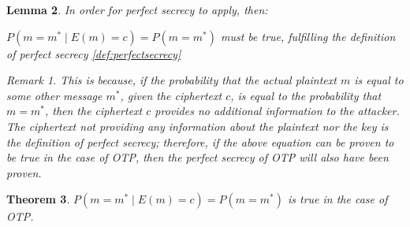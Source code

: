 \documentclass[12pt, a4paper]{report}
\newtheorem{thm}{Theorem}[section]
\newtheorem{lemma}[thm]{Lemma}
\theoremstyle{definition}
\theoremstyle{remark}
\newtheorem{rem}[thm]{Remark}
\begin{document}
\begin{lemma}
In order for perfect secrecy to apply, then:

$P( m=m^{*} \mid E(m)=c ) = P( m=m^{*} )$
must be true, fulfilling the definition of perfect secrecy \ref{def:perfectsecrecy}

\begin{rem}
This is because, if the probability that the actual plaintext $m$ is equal to some other message $m^{*}$, given the ciphertext $c$, is equal to the probability that $m=m^{*}$, then the ciphertext $c$ provides no additional information to the attacker. The ciphertext not providing any information about the plaintext nor the key is the definition of perfect secrecy; therefore, if the above equation can be proven to be true in the case of OTP, then the perfect secrecy of OTP will also have been proven.
\end{rem}
\end{lemma}

\begin{thm}
$P( m=m^{*} \mid E(m)=c ) = P( m=m^{*} )$ is true in the case of OTP.
\end{thm}
\end{document}
